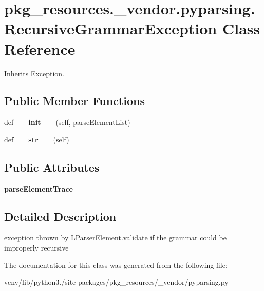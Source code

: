 \hypertarget{classpkg__resources_1_1__vendor_1_1pyparsing_1_1_recursive_grammar_exception}{}\section{pkg\+\_\+resources.\+\_\+vendor.\+pyparsing.\+Recursive\+Grammar\+Exception Class Reference}
\label{classpkg__resources_1_1__vendor_1_1pyparsing_1_1_recursive_grammar_exception}


Inherits Exception.

\subsection*{Public Member Functions}
\begin{DoxyCompactItemize}
\item 
\mbox{\label{classpkg__resources_1_1__vendor_1_1pyparsing_1_1_recursive_grammar_exception_ab0f03a877e4f179218acae0ce0c7ddbb}} 
def {\bfseries \+\_\+\+\_\+init\+\_\+\+\_\+} (self, parse\+Element\+List)
\item 
\mbox{\label{classpkg__resources_1_1__vendor_1_1pyparsing_1_1_recursive_grammar_exception_a704085665e38509282981b636097fadd}} 
def {\bfseries \+\_\+\+\_\+str\+\_\+\+\_\+} (self)
\end{DoxyCompactItemize}
\subsection*{Public Attributes}
\begin{DoxyCompactItemize}
\item 
\mbox{\label{classpkg__resources_1_1__vendor_1_1pyparsing_1_1_recursive_grammar_exception_ae82bfd4097aa1150bf622d4db2b70434}} 
{\bfseries parse\+Element\+Trace}
\end{DoxyCompactItemize}


\subsection{Detailed Description}
\begin{DoxyVerb}exception thrown by L{ParserElement.validate} if the grammar could be improperly recursive\end{DoxyVerb}
 

The documentation for this class was generated from the following file\+:\begin{DoxyCompactItemize}
\item 
venv/lib/python3./site-\/packages/pkg\+\_\+resources/\+\_\+vendor/pyparsing.\+py\end{DoxyCompactItemize}
